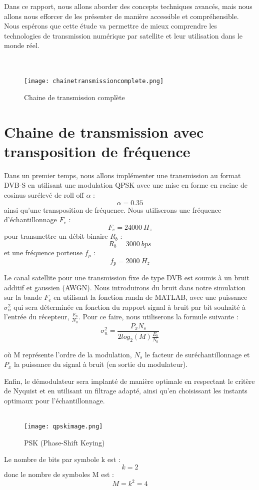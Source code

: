 \documentclass[11pt]{article}
\begin{document}
Dans ce rapport, nous allons aborder des concepts techniques avancés, mais nous allons nous efforcer de les présenter de manière accessible et compréhensible. Nous espérons que cette étude va permettre de mieux comprendre les technologies de transmission numérique par satellite et leur utilisation dans le monde réel.\\\\\\

\begin{figure}[ht!]
    \centering
    \texttt{[image: chainetransmissioncomplete.png]}
    \caption{Chaine de transmission complète \label{fig : chainetransmissioncomplete}}
\end{figure}

\newpage
\section{Chaine de transmission avec transposition de fréquence}
Dans un premier temps, nous allons implémenter une transmission au format DVB-S en utilisant une modulation QPSK avec une mise en forme en racine de cosinus surélevé de roll off $\alpha$ : 
$$\alpha = 0.35$$
ainsi qu'une transposition de fréquence. Nous utiliserons une fréquence d'échantillonnage $F_e$ :
$$F_e = 24000 \ H_z$$
pour transmettre un débit binaire $R_b$ :
$$R_b = 3000 \ bps$$
et une fréquence porteuse $f_p$ :
$$f_p = 2000 \ H_z$$

Le canal satellite pour une transmission fixe de type DVB est soumis à un bruit additif et gaussien (AWGN). Nous introduirons du bruit dans notre simulation sur la bande $F_e$ en utilisant la fonction randn de MATLAB, avec une puissance $\sigma_n^2$ qui sera déterminée en fonction du rapport signal à bruit par bit souhaité à l'entrée du récepteur, $\frac{E_b}{N_0}$. Pour ce faire, nous utiliserons la formule suivante :
$$\sigma_n^2 = \frac{P_xN_s}{2log_2(M) \frac{E_b}{N_0}}$$

où M représente l'ordre de la modulation, $N_s$ le facteur de suréchantillonnage et $P_x$ la puissance du signal à bruit (en sortie du modulateur).

Enfin, le démodulateur sera implanté de manière optimale en respectant le critère de Nyquist et en utilisant un filtrage adapté, ainsi qu'en choisissant les instants optimaux pour l'échantillonnage.\\\\

\begin{figure}[ht!]
    \centering
    \texttt{[image: qpskimage.png]}
    \caption{PSK (Phase-Shift Keying) \label{fig : chainetransmissioncomplete}}
\end{figure}
Le nombre de bits par symbole k est :
$$k = 2$$
donc le nombre de symboles M est :
$$M = k^2 = 4$$
\end{document}
